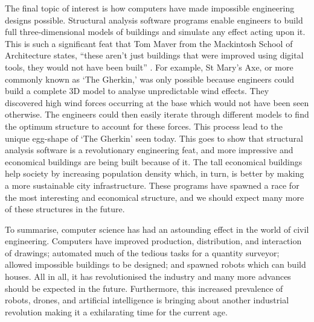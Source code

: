 \documentclass[11pt]{article} %
\begin{document}
The final topic of interest is how computers have made impossible engineering designs possible. Structural analysis software programs enable engineers to build full three-dimensional models of buildings and simulate any effect acting upon it. This is such a significant feat that Tom Maver from the Mackintosh School of Architecture states, ``these aren't just buildings that were improved using digital tools, they would not have been built'' \cite{AnalysisWithComp}. For example, St Mary's Axe, or more commonly known as `The Gherkin,' was only possible because engineers could build a complete 3D model to analyse unpredictable wind effects. They discovered high wind forces occurring at the base which would not have been seen otherwise. The engineers could then easily iterate through different models to find the optimum structure to account for these forces. This process lead to the unique egg-shape of `The Gherkin' seen today. This goes to show that structural analysis software is a revolutionary engineering feat, and more impressive and economical buildings are being built because of it. The tall economical buildings help society by increasing population density which, in turn, is better by making a more sustainable city infrastructure. These programs have spawned a race for the most interesting and economical structure, and we should expect many more of these structures in the future. 

To summarise, computer science has had an astounding effect in the world of civil engineering. Computers have improved production, distribution, and interaction of drawings; automated much of the tedious tasks for a quantity surveyor; allowed impossible buildings to be designed; and spawned robots which can build houses. All in all, it has revolutionised the industry and many more advances should be expected in the future. Furthermore, this increased prevalence of robots, drones, and artificial intelligence is bringing about another industrial revolution making it a exhilarating time for the current age.










\end{document}
